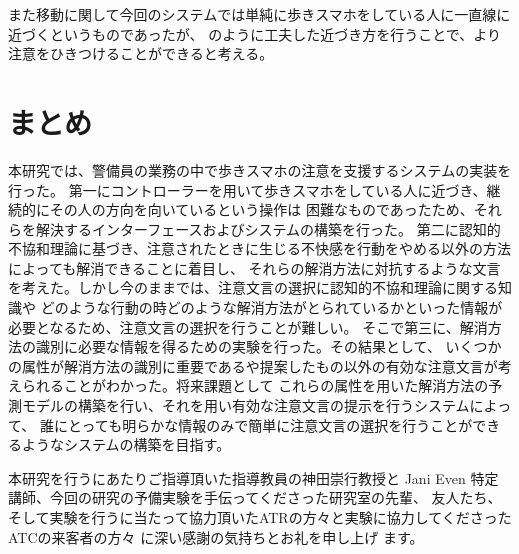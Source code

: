 \documentclass{kuisthesis}
\begin{document}
また移動に関して今回のシステムでは単純に歩きスマホをしている人に一直線に近づくというものであったが、
\cite{Mizumaru2019}のように工夫した近づき方を行うことで、より注意をひきつけることができると考える。
\section{まとめ}
本研究では、警備員の業務の中で歩きスマホの注意を支援するシステムの実装を行った。
第一にコントローラーを用いて歩きスマホをしている人に近づき、継続的にその人の方向を向いているという操作は
困難なものであったため、それらを解決するインターフェースおよびシステムの構築を行った。
第二に認知的不協和理論に基づき、注意されたときに生じる不快感を行動をやめる以外の方法によっても解消できることに着目し、
それらの解消方法に対抗するような文言を考えた。しかし今のままでは、注意文言の選択に認知的不協和理論に関する知識や
どのような行動の時どのような解消方法がとられているかといった情報が必要となるため、注意文言の選択を行うことが難しい。
そこで第三に、解消方法の識別に必要な情報を得るための実験を行った。その結果として、
いくつかの属性が解消方法の識別に重要であるや提案したもの以外の有効な注意文言が考えられることがわかった。将来課題として
これらの属性を用いた解消方法の予測モデルの構築を行い、それを用い有効な注意文言の提示を行うシステムによって、
誰にとっても明らかな情報のみで簡単に注意文言の選択を行うことができるようなシステムの構築を目指す。

\acknowledgments %
本研究を行うにあたりご指導頂いた指導教員の神田崇行教授と Jani Even
特定講師、今回の研究の予備実験を手伝ってくださった研究室の先輩、
友人たち、そして実験を行うに当たって協力頂いたATRの方々と実験に協力してくださったATCの来客者の方々
に深い感謝の気持ちとお礼を申し上げ
ます。

\nocite{*}
\end{document}
